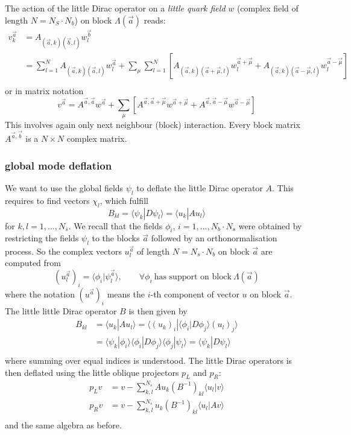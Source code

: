 The action of the little Dirac operator on a \emph{little
  quark field} $w$ (complex field of length $N=N_S\cdot N_b$) on block
$\Lambda(\vec a)$ reads: 
\[
\begin{split}
  v_k^{\vec a} &= A_{(\vec a,k)(\vec b, l)} w_l^{\vec b}\\
  &= \sum_{l=1}^N  A_{(\vec a,k)(\vec a, l)} w_l^{\vec a} + 
  \sum_{\mu} \sum_{l=1}^N [A_{(\vec a,k)(\vec a+\vec\mu, l)} w_l^{\vec
    a+\vec\mu} + A_{(\vec a,k)(\vec a-\vec\mu, l)} w_l^{\vec a - \vec\mu}]\\
\end{split}
\]
or in matrix notation
\[
v^{\vec a} = A^{\vec a,\vec a} w^{\vec a} + \sum_\mu [A^{\vec a,\vec
  a+\vec\mu} w^{\vec a+\vec\mu} +  A^{\vec a,\vec a-\vec\mu} w^{\vec a-\vec\mu}]
\]
This involves again only next neighbour (block) interaction. 
Every block matrix $A^{\vec a,\vec b}$ is a $N\times N$ complex
matrix.

\subsubsection{global mode deflation}

We want to use the global fields $\psi_l$ to deflate the little Dirac
operator $A$. This requires to find vectors $\chi_l$, which fulfill
\begin{equation}
  \label{eq:llD}
  B_{kl} = \langle\psi_k|D \psi_l\rangle = \langle u_k|A u_l\rangle
\end{equation}
for $k,l = 1,...,N_s$. We recall that the fields $\phi_i$, $i=
1,...,N_b\cdot N_s$ were obtained by restricting the fields $\psi_l$ to
the blocks $\vec a$ followed by an orthonormalisation process. So the
complex vectors $u_l^{\vec a}$ of length $N=N_s\cdot N_b$ on block
$\vec a$ are computed from 
\begin{equation}
  \label{eq:chis}
  (u^{\vec a}_l)_i = \langle\phi_i|\psi_l^{\vec
    a}\rangle,\qquad\forall \phi_i\ \textrm{has support on block}\
  \Lambda(\vec a)
\end{equation}
where the notation $(u^{\vec a})_i$ means the $i$-th component of
vector $u$ on block $\vec a$. The little little Dirac operator $B$ is
then given by
\[
\begin{split}
  B_{kl} &= \langle u_k|A u_l\rangle =
  \langle(u_k)_i|\langle\phi_i|D \phi_j\rangle (u_l)_j\rangle\\
  &= \langle\psi_k|\phi_i\rangle\langle\phi_i|D
  \phi_j\rangle\langle\phi_j |\psi_l\rangle = \langle\psi_k|D \psi_l\rangle \\
\end{split}
\]
where summing over equal indices is understood. The little Dirac
operators is then deflated using the little oblique projectors $p_L$
and $p_R$:
\[
\begin{split}
  p_L v &= v - \sum_{k,l}^{N_s}
  A u_k(B^{-1})_{kl}\langle u_l|v\rangle\\
  p_R v &= v - \sum_{k,l}^{N_s}
  u_k(B^{-1})_{kl}\langle u_l|A v\rangle\\
\end{split}
\]
and the same algebra as before.

